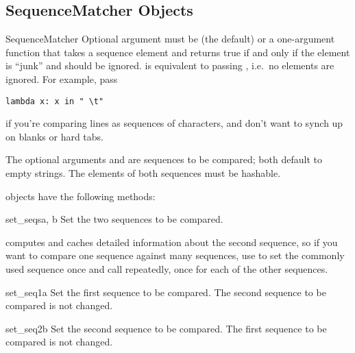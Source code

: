 \subsection{SequenceMatcher Objects \label{sequence-matcher}}

\begin{classdesc}{SequenceMatcher}{}
  Optional argument  must be  (the default) or
  a one-argument function that takes a sequence element and returns
  true if and only if the element is ``junk'' and should be ignored.
   is equivalent to passing , i.e.\ no
  elements are ignored.  For example, pass

\begin{verbatim}
lambda x: x in " \t"
\end{verbatim}

  if you're comparing lines as sequences of characters, and don't want
  to synch up on blanks or hard tabs.

  The optional arguments  and  are sequences to be
  compared; both default to empty strings.  The elements of both
  sequences must be hashable.
\end{classdesc}


 objects have the following methods:

\begin{methoddesc}{set_seqs}{a, b}
  Set the two sequences to be compared.
\end{methoddesc}

 computes and caches detailed information about
the second sequence, so if you want to compare one sequence against
many sequences, use  to set the commonly used
sequence once and call  repeatedly, once for each
of the other sequences.

\begin{methoddesc}{set_seq1}{a}
  Set the first sequence to be compared.  The second sequence to be
  compared is not changed.
\end{methoddesc}

\begin{methoddesc}{set_seq2}{b}
  Set the second sequence to be compared.  The first sequence to be
  compared is not changed.
\end{methoddesc}

